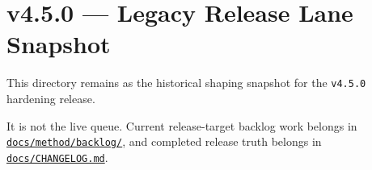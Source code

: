 \chapter{v4.5.0 --- Legacy Release Lane Snapshot}\label{record-392}

\smallskip

This directory remains as the historical shaping snapshot for the \texttt{v\allowbreak{}4\allowbreak{}.\allowbreak{}5\allowbreak{}.\allowbreak{}0} hardening release.

It is not the live queue. Current release-target backlog work belongs in \href{https://github.com/flyingrobots/bijou/blob/cbd70612140e7a450d764b3c7be1c6af878b99bc/docs/method/graveyard/method/backlog/README.md}{\texttt{d\allowbreak{}o\allowbreak{}c\allowbreak{}s\allowbreak{}/\allowbreak{}m\allowbreak{}e\allowbreak{}t\allowbreak{}h\allowbreak{}o\allowbreak{}d\allowbreak{}/\allowbreak{}b\allowbreak{}a\allowbreak{}c\allowbreak{}k\allowbreak{}l\allowbreak{}o\allowbreak{}g\allowbreak{}/}}, and completed release truth belongs in \href{https://github.com/flyingrobots/bijou/blob/cbd70612140e7a450d764b3c7be1c6af878b99bc/docs/method/graveyard/CHANGELOG.md}{\texttt{d\allowbreak{}o\allowbreak{}c\allowbreak{}s\allowbreak{}/\allowbreak{}C\allowbreak{}H\allowbreak{}A\allowbreak{}N\allowbreak{}G\allowbreak{}E\allowbreak{}L\allowbreak{}O\allowbreak{}G\allowbreak{}.\allowbreak{}m\allowbreak{}d}}.

